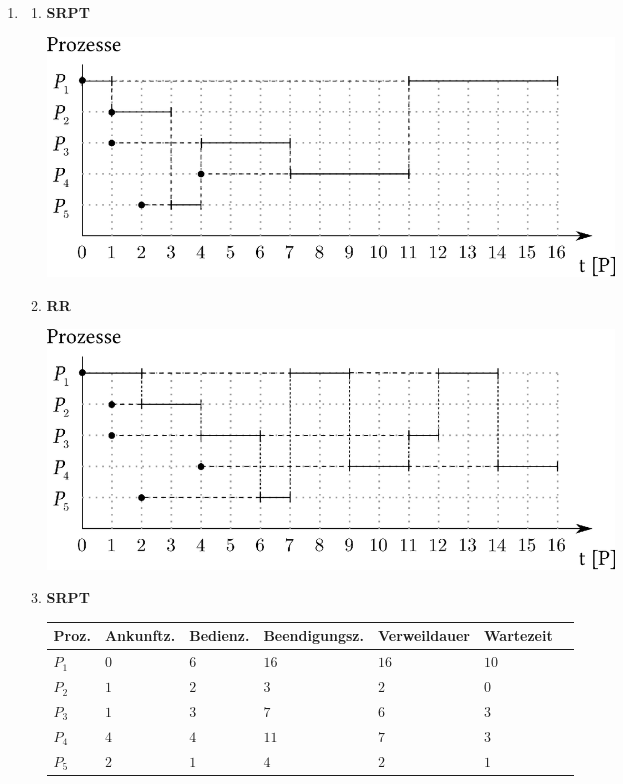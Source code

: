 \begin{enumerate}[label={Aufgabe H\arabic*},start=20]
	\item 
		\begin{enumerate}
			\item \textbf{SRPT} \blanko

				\begin{center}
					\includegraphics[width=0.7\textwidth]{20a.eps}
				\end{center}
			\item \textbf{RR} \blanko

				\begin{center}
					\includegraphics[width=0.7\textwidth]{20b.eps}
				\end{center}

			\item \textbf{SRPT}
				\vspace{1em}
				\begin{center}
					\renewcommand*{\arraystretch}{1.2}
					\begin{tabular}{@{}lllllll@{}}
						\toprule
						{\small Proz.} & {\small Ankunftz.} & {\small Bedienz.} & {\small Beendigungsz.} & {\small Verweildauer} & {\small Wartezeit} \\
						\midrule
						$P_1$ & $0$ & $6$ & $16$ & $16$ & $10$ \\
						$P_2$ & $1$ & $2$ & $3$ & $2$ & $0$ \\
						$P_3$ & $1$ & $3$ & $7$ & $6$ & $3$ \\
						$P_4$ & $4$ & $4$ & $11$ & $7$ & $3$ \\
						$P_5$ & $2$ & $1$ & $4$ & $2$ & $1$ \\
						\bottomrule
					\end{tabular}
				\end{center}
				\vspace{1em}


\end{enumerate}
\end{enumerate}
